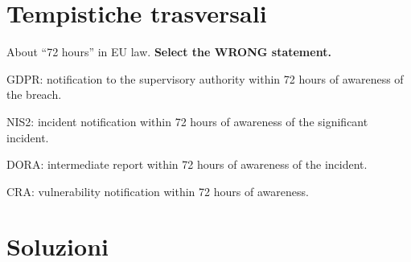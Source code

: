 \section{Tempistiche trasversali}

\begin{domanda}\label{q:72h}
About ``72 hours'' in EU law. \textbf{Select the WRONG statement.}
\begin{opzioni}
  \item GDPR: notification to the supervisory authority within 72 hours of awareness of the breach.
  \item NIS2: incident notification within 72 hours of awareness of the significant incident.
  \item DORA: intermediate report within 72 hours of awareness of the incident.
  \item CRA: vulnerability notification within 72 hours of awareness.
\end{opzioni}
\end{domanda}

\section{Soluzioni}

